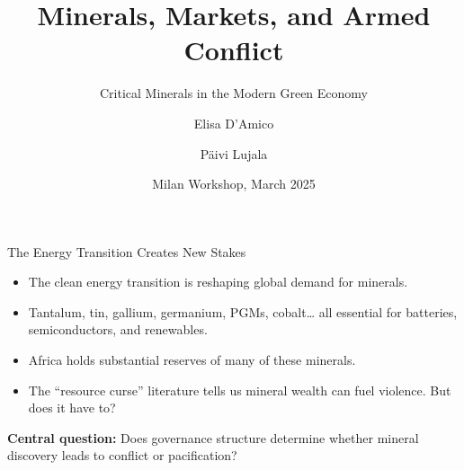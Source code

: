 \documentclass[aspectratio=169,11pt]{beamer}
\title{Minerals, Markets, and Armed Conflict}
\subtitle{Critical Minerals in the Modern Green Economy}
\author{Elisa D'Amico \and P\"aivi Lujala}
\institute{University College Dublin \and University of Oulu}
\date{Milan Workshop, March 2025}
\begin{document}
\maketitle


\begin{frame}{The Energy Transition Creates New Stakes}
\begin{itemize}
    \item The clean energy transition is reshaping global demand for minerals.
    \item Tantalum, tin, gallium, germanium, PGMs, cobalt\ldots{} all essential for batteries, semiconductors, and renewables.
    \item Africa holds substantial reserves of many of these minerals.
    \item The ``resource curse'' literature tells us mineral wealth can fuel violence. But does it have to?
\end{itemize}

\vspace{0.8em}
\textcolor{sage}{\textbf{Central question:}} Does governance structure determine whether mineral discovery leads to conflict or pacification?
\end{frame}

\end{document}

